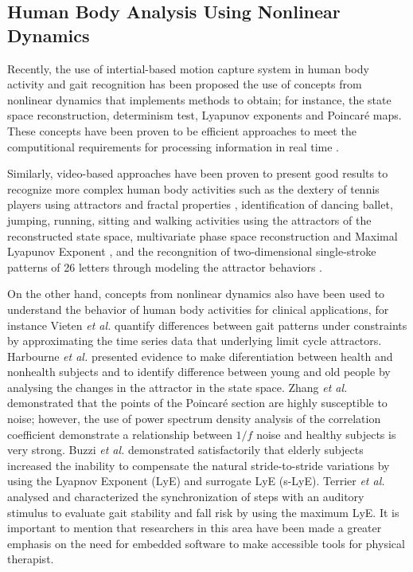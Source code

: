 \documentclass{sigchi}
\begin{document}
\subsection{Human Body Analysis Using Nonlinear Dynamics}

Recently, the use of intertial-based motion capture system in human body activity 
and gait recognition has been proposed the use of concepts from nonlinear dynamics 
that implements methods to obtain; for instance, the state space reconstruction,
determinism test, Lyapunov exponents and Poincar\'e maps.
These concepts have been proven to be efficient approaches to meet the computitional 
requirements for processing information in real time
\cite{J.FrankS.Mannor2010, Sama2013, Gouwanda2012,Perc2005, Akiduki2013,Akiduki2014}. 

Similarly, video-based approaches have been proven to present good results 
to recognize more complex human body activities such as the dextery of tennis players 
using attractors and fractal properties \cite{Yamamoto2000,Suzuki2013} 
, identification of dancing ballet, jumping, running, sitting and walking activities
using the attractors of the reconstructed state space, 
multivariate phase space reconstruction
and Maximal Lyapunov Exponent 
\cite{Ali2007,Basharat2009,Venkataraman2013}, and the recongnition of 
two-dimensional single-stroke patterns of 26 letters 
through modeling the attractor behaviors \cite{Ijspeert2013}. 

On the other hand, concepts from nonlinear dynamics also have been used to understand 
the behavior of human body activities for clinical applications, for instance
Vieten \emph{et al.} \cite{Vieten2013} quantify differences between gait patterns 
under constraints by approximating the time series data that underlying limit cycle 
attractors. 
Harbourne \emph{et al.} \cite{Harbourne2009} presented evidence 
to make diferentiation between health and nonhealth subjects and 
to identify difference between young and old people 
by analysing the changes in the attractor in the state space.
Zhang \textit{et al.} \cite{Zhang2010} demonstrated that the points of the 
Poincar\'e section are highly susceptible to noise; however, the use of power 
spectrum density analysis of the correlation coefficient demonstrate a relationship 
between $1/f$ noise and healthy subjects is very strong.
Buzzi \textit{et al.} \cite{Buzzi2003} demonstrated satisfactorily that elderly 
subjects increased the inability to compensate the natural stride-to-stride variations
by using the Lyapnov Exponent (LyE) and surrogate LyE (s-LyE).
Terrier \textit{et al.} \cite{Terrier2013} analysed and characterized the 
synchronization of steps with an auditory stimulus to evaluate gait stability 
and fall risk by using the maximum LyE.
It is important to mention that researchers in this area have been made 
a greater emphasis on the need for embedded software to make accessible 
tools for physical therapist.
\end{document}
